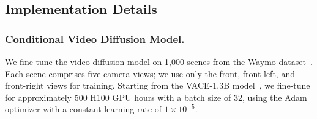 \documentclass[runningheads]{llncs}
\begin{document}
\begin{table}
\centering
\caption{Quantitative comparison in a lane-change scenario where the trajectory gradually shifts 4 m to the left.}
\vspace{-0.1in}

\label{tab:table_comparison1}
\end{table}
\vspace{-0.3in}


\subsection{Implementation Details}

\subsubsection{Conditional Video Diffusion Model.}
We fine-tune the video diffusion model on 1{,}000 scenes from the Waymo dataset~\cite{Sun_2020_CVPR}. Each scene comprises five camera views; we use only the front, front-left, and front-right views for training. Starting from the VACE-1.3B model~\cite{jiang2025vace}, we fine-tune for approximately 500 H100 GPU hours with a batch size of 32, using the Adam optimizer with a constant learning rate of $1\!\times\!10^{-5}$.
\end{document}
